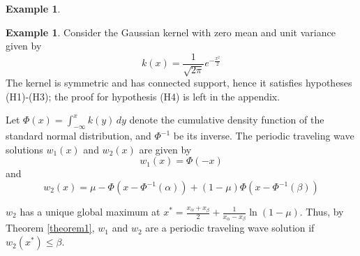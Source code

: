 \documentclass[11pt]{article}
\theoremstyle{definition}
\newtheorem{ex}[thm]{Example}
\numberwithin{equation}{section}
\numberwithin{thm}{section}
\renewcommand{\a}{\alpha}
\renewcommand{\b}{\beta}
\newcommand{\m}{\mu}
\begin{document}
\begin{ex}
%
%
%
%
%
%
%
%
%
%
%
%
%
%
%

\end{ex}

\begin{ex} Consider the Gaussian kernel with zero mean and unit variance given by
$$ k(x) = \frac{1}{\sqrt{2\pi}} e^{-\frac{x^2}{2}} $$
The kernel is symmetric and has connected support, hence it satisfies hypotheses (H1)-(H3); the proof for hypothesis (H4) is left in the appendix.

Let $\Phi(x)=\int_{-\infty}^{x}k(y)\,dy$ denote the cumulative density function of the standard normal distribution, and $\Phi^{-1}$ be its inverse. The periodic traveling wave solutions $w_1(x)$ and $w_2(x)$ are given by
\begin{equation}
w_1(x) = \Phi(-x)
\end{equation}
and
\begin{equation}
w_2(x)=  \m - \Phi(x-\Phi^{-1}(\a)) + (1-\m)\Phi(x-\Phi^{-1}(\b))
\end{equation}

$w_2$ has a unique global maximum at $x^*=\frac{x_\a+x_\b}{2} + \frac{1}{x_\a-x_\b}\ln\left(1-\m\right)$. Thus, by Theorem \ref{theorem1}, $w_1$ and $w_2$ are a periodic traveling wave solution if $w_2(x^*)\leq \b$.
\end{ex}
\end{document}
